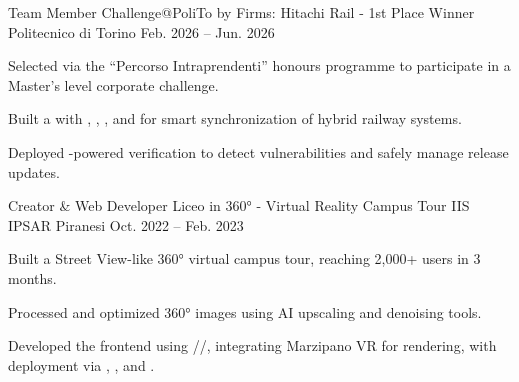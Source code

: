 
\begin{cventries}

  \cventry
    {Team Member} %
    {Challenge@PoliTo by Firms: Hitachi Rail - 1st Place Winner} %
    {Politecnico di Torino} %
    {Feb. 2026 -- Jun. 2026} %
    {
      \begin{cvitems} %
        \item {Selected via the ``Percorso Intraprendenti'' honours programme to participate in a Master's level corporate challenge.}
        \item {Built a  with , , , and  for smart synchronization of hybrid railway systems.}
        \item {Deployed -powered verification to detect vulnerabilities and safely manage release updates.}
      \end{cvitems}
    }

  \cventry
    {Creator \& Web Developer} %
    {Liceo in 360° - Virtual Reality Campus Tour} %
    {IIS IPSAR Piranesi} %
    {Oct. 2022 -- Feb. 2023} %
    {
      \begin{cvitems} %
        \item {Built a Street View-like 360° virtual campus tour, reaching 2,000+ users in 3 months.}
        \item {Processed and optimized 360° images using AI upscaling and denoising tools.}
        \item {Developed the frontend using //, integrating Marzipano VR for rendering, with deployment via , , and .}
      \end{cvitems}
    }


\end{cventries}
